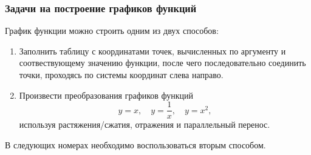 \documentclass[algebra,twocolumn]{pum}
\date{24.03.20}
\begin{document}
\subsubsection*{Задачи на построение графиков функций}
График функции можно строить одним из двух способов:
\begin{enumerate}[nosep]
  \item Заполнить таблицу с координатами точек, вычисленных по аргументу и соотвествующему значению функции, после чего последовательно соединить точки, проходясь по системы координат слева направо.
  \item Произвести преобразования графиков функций
    \begin{equation*}
      y=x,\quad y=\frac{1}{x},\quad y=x^2,
    \end{equation*}
    используя растяжения/сжатия, отражения и параллельный перенос.
\end{enumerate}
В следующих номерах необходимо воспользоваться вторым способом.
\end{document}
